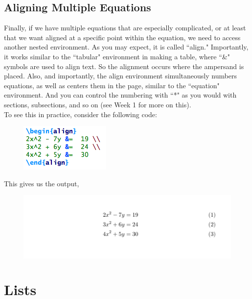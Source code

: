\documentclass[11pt]{article}
\newcommand{\forceindent}{\leavevmode{\parindent=1.5em\indent}} %
\begin{document}
\subsection{Aligning Multiple Equations}

\forceindent Finally, if we have multiple equations that are especially complicated, or at least that we want aligned at a specific point within the equation, we need to access another nested environment. As you may expect, it is called ``align." Importantly, it works similar to the ``tabular" environment in making a table, where ``\&" symbols are used to align text. So the alignment occurs where the ampersand is placed. Also, and importantly, the align environment simultaneously numbers equations, as well as centers them in the page, similar to the ``equation" environment. And you can control the numbering with ``*" as you would with sections, subsections, and so on (see Week 1 for more on this). \\

To see this in practice, consider the following code:

\begin{figure}[!h]
	\includegraphics[scale=.6]{CODE7} \\
	\centering
\end{figure}

\newpage

This gives us the output, \\

\begin{figure}[!h]
	\includegraphics[scale=.6]{OUT7} \\
	\centering
\end{figure}

\newpage 

\section{Lists}
\end{document}
